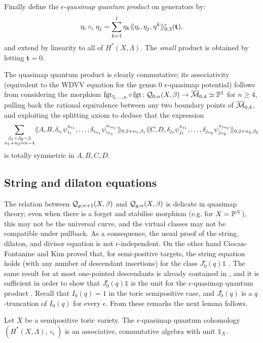 Finally define the $\epsilon$-\emph{quasimap quantum product} on generators by:
\[\eta_i\circ_\epsilon \eta_j=\sum_{k=1}^l\eta_k\langle\!\langle\eta_i,\eta_j,\eta^k\rangle\!\rangle^\epsilon_{0,3}(\mathbf{t}),\]
and extend by linearity to all of $H^*(X,\Lambda)$. The \emph{small} product is obtained by letting $\mathbf t=0$.

\begin{rmk}
 The quasimap quantum product is clearly commutative; its associativity (equivalent to the WDVV equation for the genus $0$ $\epsilon$-quasimap potential) follows from considering the morphism $\operatorname{fgt}_{5,\ldots,n}\circ\operatorname{fgt}\colon \mathcal{Q}_{0,n}(X,\beta)\rightarrow\overline{\mathcal{M}}_{0,4}\simeq\mathbb P^1$ for $n\geq 4$, pulling back the rational equivalence between any two boundary points of $\overline{\mathcal{M}}_{0,4}$, and exploiting the splitting axiom to deduce that the expression
 \[\sum_{\substack{\beta_1+\beta_2=\beta \\ n_1+n_2=n-4}}\langle\!\langle A,B,\delta_{i_1}\psi_{i_1}^{a_{i_1}},\ldots,\delta_{i_{n_1}}\psi_{i_{n_1}}^{a_{i_{n_1}}}\rangle\!\rangle_{0,2+n_1,\beta_1}\langle\!\langle C,D,\delta_{j_1}\psi_{j_1}^{a_{j_1}},\ldots,\delta_{j_{n_2}}\psi_{j_{n_2}}^{a_{j_{n_2}}}\rangle\!\rangle_{0,2+n_2,\beta_2}\]
 is totally symmetric in $A,B,C,D$.
\end{rmk}
\subsection{String and dilaton equations}
 The relation between $\mathcal{Q}_{g,n+1}(X,\beta)$ and $\mathcal{Q}_{g,n}(X,\beta)$ is delicate in quasimap theory; even when there is a forget and stabilise morphism (e.g. for $X=\mathbb P^N$), this may not be the universal curve, and the virtual classes may not be compatible under pullback. As a consequence, the usual proof of the string, dilaton, and divisor equation is not $\epsilon$-independent. On the other hand Ciocan-Fontanine and Kim proved that, for semi-positive targets, the string equation holds (with any number of descendant insertions) for the class $J_0^\epsilon(q)\mathds{1}$ \cite[Proposition 3.4.1]{CF-K-higher-genus}. The same result for at most one-pointed descendants is already contained in \cite[Corollary 5.5.4]{CF-K-wallcrossing}, and it is sufficient in order to show that $J_0^\epsilon(q)\mathds{1}$ is the unit for the $\epsilon$-quasimap quantum product \cite[Remark 3.1.4]{CF-K-higher-genus}. Recall that $I_0(q)=1$ in the toric semipositive case, and $J_0^\epsilon(q)$ is a $q$-truncation of $I_0(q)$ for every $\epsilon$. From these remarks the next lemma follows.

 \begin{lemma}
 Let $X$ be a semipositive toric variety. The $\epsilon$-quasimap quantum cohomology $(H^*(X,\Lambda),\circ_\epsilon)$ is an associative, commutative algebra with unit $\mathds 1_X$.
 \end{lemma}
 
